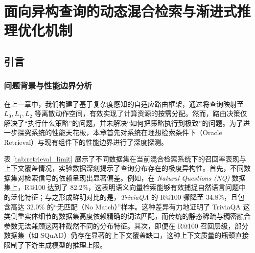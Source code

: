 \renewcommand{\algorithmcfname}{方法}

\chapter{面向异构查询的动态混合检索与渐进式推理优化机制}\label{chap04}

\section{引言}\label{sec:chap04_intro}

\subsection{问题背景与性能边界分析}\label{sec:chap04_problem_analysis}

在上一章中，我们构建了基于复杂度感知的自适应路由框架，通过将查询映射至 $L_0, L_1, L_2$ 等离散动作空间，有效实现了计算资源的按需分配。然而，路由决策仅解决了“执行什么策略”的问题，并未解决“如何把策略执行到极致”的问题。为了进一步探究系统的性能天花板，本章首先对系统在理想检索条件下（Oracle Retrieval）与现有组件下的性能边界进行了深度探测。

表 \ref{tab:retrieval_limit} 展示了不同数据集在当前混合检索系统下的召回率表现与上下文覆盖情况，实验数据深刻揭示了查询分布存在的极度异构性。首先，不同数据集对检索信号的依赖呈现出显著偏差。例如，在 \textit{Natural Questions (NQ)} 数据集上，R@100 达到了 82.2\%，这表明语义向量检索能够有效捕捉自然语言问题中的泛化特征；与之形成鲜明对比的是，\textit{TriviaQA} 的 R@100 骤降至 34.8\%，且包含高达 32.0\% 的“无匹配（No Match）”样本。这种差异有力地证明了 TriviaQA 这类侧重实体细节的数据集高度依赖精确的词法匹配，而传统的静态稀疏与稠密融合参数无法兼顾这两种截然不同的分布特征。其次，即便在 R@100 召回层级，部分数据集（如 SQuAD）仍存在显著的上下文覆盖缺口，这种上下文质量的瓶颈直接限制了下游生成模型的推理上限。

